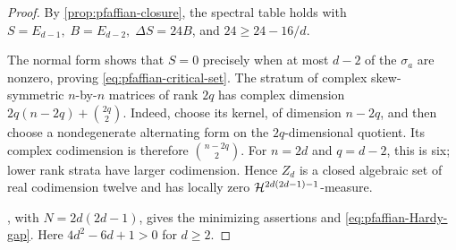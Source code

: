 \begin{proof}
By \cref{prop:pfaffian-closure}, the spectral table holds with \(S=E_{d-1},\; B=E_{d-2},\; \Delta S=24B\),
and \(24\ge24-16/d\).

The normal form shows that \(S=0\) precisely when at most
\(d-2\) of the \(\sigma_a\) are nonzero, proving
\eqref{eq:pfaffian-critical-set}. The stratum of
complex skew-symmetric \(n\)-by-\(n\) matrices of rank \(2q\)
has complex dimension \(2q(n-2q)+\binom{2q}{2}\).
Indeed, choose its kernel, of dimension \(n-2q\), and then choose
a nondegenerate alternating form on the \(2q\)-dimensional quotient.
Its complex codimension is therefore
\(\binom{n-2q}{2}\).
For \(n=2d\) and \(q=d-2\), this is six; lower rank strata have
larger codimension.  Hence \(Z_d\) is a closed algebraic set of
real codimension twelve and has locally zero
\(\mathcal H^{2d(2d-1)-1}\)-measure.

, with \(N=2d(2d-1)\),
gives the minimizing assertions and \eqref{eq:pfaffian-Hardy-gap}.
Here \(4d^2-6d+1>0\) for \(d\ge2\).
\end{proof}

